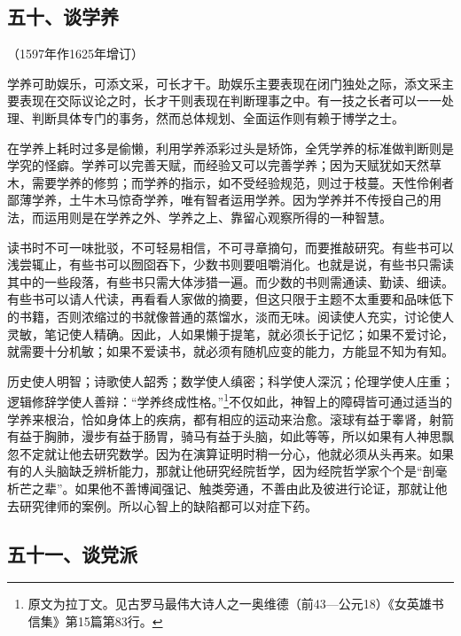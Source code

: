 \subsection*{五十、谈学养}
\begin{center}
    （1597年作1625年增订）
\end{center}
\par 学养可助娱乐，可添文采，可长才干。助娱乐主要表现在闭门独处之际，添文采主要表现在交际议论之时，长才干则表现在判断理事之中。有一技之长者可以一一处理、判断具体专门的事务，然而总体规划、全面运作则有赖于博学之士。
\par 在学养上耗时过多是偷懒，利用学养添彩过头是矫饰，全凭学养的标准做判断则是学究的怪癖。学养可以完善天赋，而经验又可以完善学养；因为天赋犹如天然草木，需要学养的修剪；而学养的指示，如不受经验规范，则过于枝蔓。天性伶俐者鄙薄学养，土牛木马惊奇学养，唯有智者运用学养。因为学养并不传授自己的用法，而运用则是在学养之外、学养之上、靠留心观察所得的一种智慧。
\par 读书时不可一味批驳，不可轻易相信，不可寻章摘句，而要推敲研究。有些书可以浅尝辄止，有些书可以囫囵吞下，少数书则要咀嚼消化。也就是说，有些书只需读其中的一些段落，有些书只需大体涉猎一遍。而少数的书则需通读、勤读、细读。有些书可以请人代读，再看看人家做的摘要，但这只限于主题不太重要和品味低下的书籍，否则浓缩过的书就像普通的蒸馏水，淡而无味。阅读使人充实，讨论使人灵敏，笔记使人精确。因此，人如果懒于提笔，就必须长于记忆；如果不爱讨论，就需要十分机敏；如果不爱读书，就必须有随机应变的能力，方能显不知为有知。
\par 历史使人明智；诗歌使人韶秀；数学使人缜密；科学使人深沉；伦理学使人庄重；逻辑修辞学使人善辩：“学养终成性格。”\footnote{原文为拉丁文。见古罗马最伟大诗人之一奥维德（前43—公元18）《女英雄书信集》第15篇第83行。}不仅如此，神智上的障碍皆可通过适当的学养来根治，恰如身体上的疾病，都有相应的运动来治愈。滚球有益于睾肾，射箭有益于胸肺，漫步有益于肠胃，骑马有益于头脑，如此等等，所以如果有人神思飘忽不定就让他去研究数学。因为在演算证明时稍一分心，他就必须从头再来。如果有的人头脑缺乏辨析能力，那就让他研究经院哲学，因为经院哲学家个个是“剖毫析芒之辈”。如果他不善博闻强记、触类旁通，不善由此及彼进行论证，那就让他去研究律师的案例。所以心智上的缺陷都可以对症下药。




\subsection*{五十一、谈党派}

